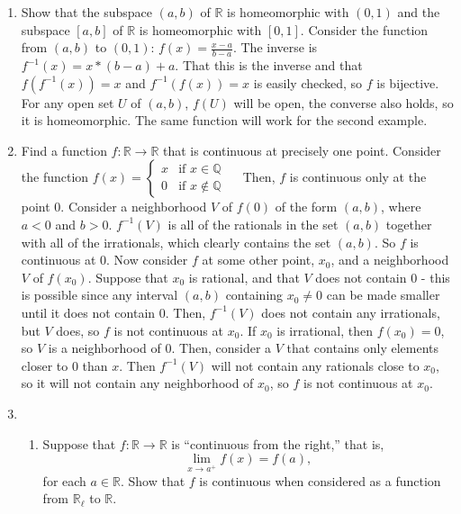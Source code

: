 \documentclass[12pt,letterpaper]{article}
\newcommand{\n}{\break}
\begin{document}
\RaggedRight
\begin{enumerate}


  
  \item Show that the subspace $(a,b)$ of $\mathbb{R}$ is homeomorphic with $(0,1)$ and the subspace $[a,b]$ of $\mathbb{R}$ is homeomorphic with $[0,1]$.\n
  \indent Consider the function from $(a,b)$ to $(0,1)$: $f(x)=\frac{x-a}{b-a}$. The inverse is $f^{-1}(x)=x*(b-a)+a$. That this is the inverse and that $f(f^{-1}(x)) = x$ and $f^{-1}(f(x))=x$ is easily checked, so $f$ is bijective. For any open set $U$ of $(a,b)$, $f(U)$ will be open, the converse also holds, so it is homeomorphic. The same function will work for the second example.
  \item Find a function $f: \mathbb{R}\rightarrow \mathbb{R}$ that is continuous at precisely one point.\hspace{5in}\n
  \indent Consider the function $f(x) = \begin{cases} x & \text{if } x\in\mathbb{Q} \\ 0 & \text{if } x\not\in\mathbb{Q}\end{cases}\quad$ Then, $f$ is continuous only at the point 0. \hspace{3in}\n
  Consider a neighborhood $V$ of $f(0)$ of the form $(a,b)$, where $a<0$ and $b>0$. $f^{-1}(V)$ is all of the rationals in the set $(a,b)$ together with all of the irrationals, which clearly contains the set $(a,b)$. So $f$ is continuous at 0. Now consider $f$ at some other point, $x_0$, and a neighborhood $V$ of $f(x_0)$. Suppose that $x_0$ is rational, and that $V$ does not contain 0 - this is possible since any interval $(a,b)$ containing $x_0\neq 0$ can be made smaller until it does not contain 0. Then, $f^{-1}(V)$ does not contain any irrationals, but $V$ does, so $f$ is not continuous at $x_0$. If $x_0$ is irrational, then $f(x_0)=0$, so $V$ is a neighborhood of $0$. Then, consider a $V$ that contains only elements closer to 0 than $x$. Then $f^{-1}(V)$ will not contain any rationals close to $x_0$, so it will not contain any neighborhood of $x_0$, so $f$ is not continuous at $x_0$.
  \item
  \begin{enumerate}
    \item Suppose that $f: \mathbb{R} \rightarrow \mathbb{R}$ is ``continuous from the right,'' that is, $$\lim_{x\rightarrow a^+} f(x)=f(a),$$ for each $a\in\mathbb{R}$. Show that $f$ is continuous when considered as a function from $\mathbb{R}_\ell$ to $\mathbb{R}$.\hspace{5in}\n

\end{enumerate}
\end{enumerate}
\end{document}
